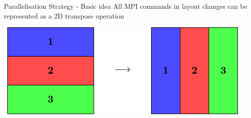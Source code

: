 \documentclass{beamer}
\begin{document}
\begin{frame}{Parallelisation Strategy - Basic idea}
 All MPI commands in layout changes can be represented as a 2D transpose operation
 \vspace{2em}

 \includegraphics[width=\textwidth]{Simple2D/Start}
\end{frame}
\end{document}
